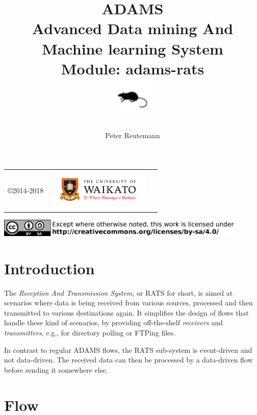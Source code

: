 \documentclass[a4paper]{book}
\title{
  \textbf{ADAMS} \\
  {\Large \textbf{A}dvanced \textbf{D}ata mining \textbf{A}nd \textbf{M}achine
  learning \textbf{S}ystem} \\
  {\Large Module: adams-rats} \\
  \vspace{1cm}
  \includegraphics[width=2cm]{images/rats-module.png} \\
}
\author{
  Peter Reutemann
}
\begin{document}
\begin{titlepage}
\maketitle

\thispagestyle{empty}
\center
\begin{table}[b]
	\begin{tabular}{c l l}
		\parbox[c][2cm]{2cm}{\copyright 2014-2018} &
		\parbox[c][2cm]{5cm}{\includegraphics[width=5cm]{images/coat_of_arms.pdf}}
	\end{tabular}
	\includegraphics[width=12cm]{images/cc.png} \\
\end{table}

\end{titlepage}

\tableofcontents

\chapter{Introduction}
The \textit{Reception And Transmission System}, or RATS for short, is aimed
at scenarios where data is being received from various sources, processed
and then transmitted to various destinations again. It simplifies the design
of flows that handle these kind of scenarios, by providing off-the-shelf
\textit{receivers} and \textit{transmitters}, e.g., for directory polling
or FTPing files.

In contrast to regular ADAMS flows, the RATS sub-system is event-driven
and not data-driven. The received data can then be processed by a data-driven
flow before sending it somewhere else.


\chapter{Flow}
\end{document}

